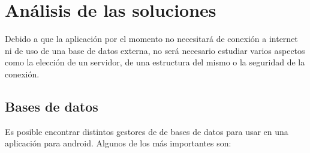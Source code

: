 \newpage

\section{Análisis de las soluciones}

Debido a que la aplicación por el momento no necesitará de conexión a internet ni de uso de una base de datos externa, no será necesario estudiar varios aspectos como la elección de un servidor, de una estructura del mismo o la seguridad de la conexión.

\subsection{Bases de datos}

Es posible encontrar distintos gestores de de bases de datos para usar en una aplicación para android. Algunos de los más importantes son\cite{databases}: 

